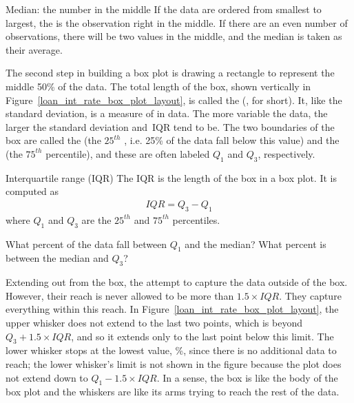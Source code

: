 \begin{onebox}{Median: the number in the middle}
  If the data are ordered from smallest to largest,
  the  is the observation right in the middle.
  If there are an even number of observations,
  there will be two values in the middle,
  and the median is taken as their average.
\end{onebox}

The second step in building a box plot is drawing
a rectangle to represent the middle 50\% of the data.
The total length of the box, shown vertically in
Figure~\ref{loan_int_rate_box_plot_layout},
is called the  (,
for short).
It, like the standard deviation, is a measure
of  in data.
The more variable the data, the larger the standard
deviation and~IQR tend to be.
The two boundaries of the box are called the
 
(the $25^{th}$ ,
i.e. 25\% of the data fall below this value)
and the  
(the $75^{th}$ percentile), and these are often labeled $Q_1$
 and $Q_3$, respectively.

\begin{onebox}{Interquartile range (IQR)}
  The IQR is the length
  of the box in a box plot.
  It is computed as
  \begin{eqnarray*}
  IQR = Q_3 - Q_1
  \end{eqnarray*}
  where $Q_1$ and $Q_3$ are the $25^{th}$ and $75^{th}$
  percentiles.
\end{onebox}

\begin{exercisewrap}
\begin{nexercise}
What percent of the data fall between $Q_1$ and the median?
What percent is between the median and $Q_3$?\footnotemark{}
\end{nexercise}
\end{exercisewrap}

Extending out from the box, the  attempt
to capture the data outside of the box.
However, their reach is never allowed to be more than
$1.5\times IQR$.
They capture everything within this reach.
In Figure~\ref{loan_int_rate_box_plot_layout},
the upper whisker does not extend to the last two points,
which is beyond $Q_3 + 1.5\times IQR$,
and so it extends only to the last point below this limit.
The lower whisker stops at the lowest value,
\loanSmallestValue{}\%,
since there is no additional data to reach;
the lower whisker's limit is not shown in the figure because
the plot does not extend down to $Q_1 - 1.5\times IQR$.
In a sense, the box is like the body of the box plot
and the whiskers are like its arms trying to reach the
rest of the data.

